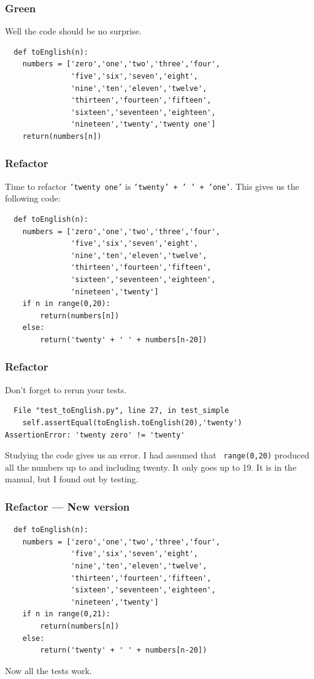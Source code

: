 \documentclass{beamer}
\begin{document}
\begin{frame}[fragile]
\frametitle{Green}
Well the code should be no surprise.
\begin{lstlisting}
  def toEnglish(n):
    numbers = ['zero','one','two','three','four',
               'five','six','seven','eight',
               'nine','ten','eleven','twelve',
               'thirteen','fourteen','fifteen',
               'sixteen','seventeen','eighteen',
               'nineteen','twenty','twenty one']
    return(numbers[n])
\end{lstlisting}
\end{frame}
\begin{frame}[fragile]
\frametitle{Refactor}
  Time to refactor {\tt 'twenty one'} 
 is {\tt 'twenty' + ' ' + 'one'}. This gives us the  following code:
\begin{lstlisting}
  def toEnglish(n):
    numbers = ['zero','one','two','three','four',
               'five','six','seven','eight',
               'nine','ten','eleven','twelve',
               'thirteen','fourteen','fifteen',
               'sixteen','seventeen','eighteen',
               'nineteen','twenty']
    if n in range(0,20):
        return(numbers[n])
    else:
        return('twenty' + ' ' + numbers[n-20])
\end{lstlisting}
\end{frame}
\begin{frame}[fragile]
\frametitle{Refactor}
  Don't forget to rerun your tests.
\begin{verbatim}
  File "test_toEnglish.py", line 27, in test_simple
    self.assertEqual(toEnglish.toEnglish(20),'twenty')
AssertionError: 'twenty zero' != 'twenty'
\end{verbatim}
Studying the code gives us an error. I had assumed that {\tt
  range(0,20)} produced all the numbers up to and including twenty. It
only goes up to 19. It is in the manual, but I found out by
testing.
\end{frame}
\begin{frame}[fragile]
\frametitle{Refactor --- New version}
\begin{lstlisting}
  def toEnglish(n):
    numbers = ['zero','one','two','three','four',
               'five','six','seven','eight',
               'nine','ten','eleven','twelve',
               'thirteen','fourteen','fifteen',
               'sixteen','seventeen','eighteen',
               'nineteen','twenty']
    if n in range(0,21):
        return(numbers[n])
    else:
        return('twenty' + ' ' + numbers[n-20])
\end{lstlisting}
  Now all the tests work.
\end{frame}
\end{document}

